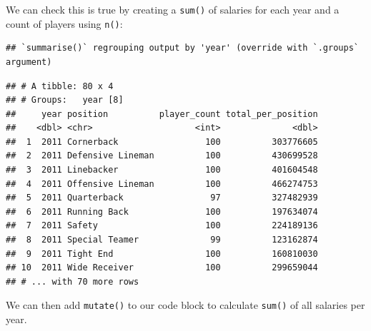 \documentclass[
]{book}
\newenvironment{Shaded}{\begin{snugshade}}{\end{snugshade}}
\newcommand{\DataTypeTok}[1]{\textcolor[rgb]{0.13,0.29,0.53}{#1}}
\newcommand{\KeywordTok}[1]{\textcolor[rgb]{0.13,0.29,0.53}{\textbf{#1}}}
\newcommand{\NormalTok}[1]{#1}
\newcommand{\OperatorTok}[1]{\textcolor[rgb]{0.81,0.36,0.00}{\textbf{#1}}}
\newcommand{\StringTok}[1]{\textcolor[rgb]{0.31,0.60,0.02}{#1}}
\begin{document}
We can check this is true by creating a \texttt{sum()} of salaries for each year and a count of players using \texttt{n()}:

\begin{Shaded}
\end{Shaded}

\begin{verbatim}
## `summarise()` regrouping output by 'year' (override with `.groups` argument)
\end{verbatim}

\begin{verbatim}
## # A tibble: 80 x 4
## # Groups:   year [8]
##     year position          player_count total_per_position
##    <dbl> <chr>                    <int>              <dbl>
##  1  2011 Cornerback                 100          303776605
##  2  2011 Defensive Lineman          100          430699528
##  3  2011 Linebacker                 100          401604548
##  4  2011 Offensive Lineman          100          466274753
##  5  2011 Quarterback                 97          327482939
##  6  2011 Running Back               100          197634074
##  7  2011 Safety                     100          224189136
##  8  2011 Special Teamer              99          123162874
##  9  2011 Tight End                  100          160810030
## 10  2011 Wide Receiver              100          299659044
## # ... with 70 more rows
\end{verbatim}

We can then add \texttt{mutate()} to our code block to calculate \texttt{sum()} of all salaries per year.

\begin{Shaded}
\end{Shaded}
\end{document}
